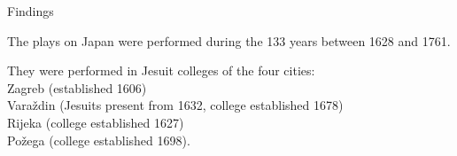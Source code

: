 \documentclass[14pt]{beamer}
\begin{document}
\begin{frame}{Findings}

The plays on Japan were performed during the 133 years between 1628 and 1761. 

They were performed in Jesuit colleges of the four cities:\\
\alert{Zagreb} (established 1606)\\
\alert{Varaždin} (Jesuits present from 1632, college established 1678)\\
\alert{Rijeka} (college established 1627)\\
\alert{Požega} (college established 1698).

\end{frame}

{
    \begin{frame}[plain]
    \end{frame}
    }





  \maketitle
\end{document}
